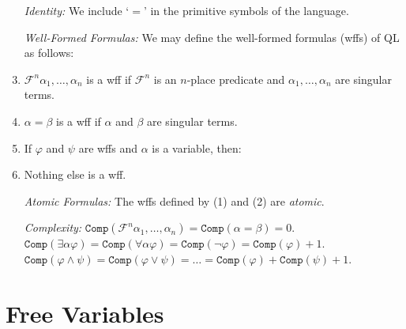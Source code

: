 \documentclass[a4paper, 11pt]{article} %
\newcommand{\F}{\mathcal{F}}
\newcommand{\comp}{\texttt{Comp}}
\begin{document}
\begin{enumerate}
  \item[\it Identity:] We include `$=$' in the primitive symbols of the language.
  \item[\it Well-Formed Formulas:] We may define the well-formed formulas (wffs) of QL as follows:
  \item $\mathcal{F}^n\alpha_1,\ldots,\alpha_n$ is a wff if $\mathcal{F}^n$ is an $n$-place predicate and $\alpha_1,\ldots,\alpha_n$ are singular terms.
  \item $\alpha=\beta$ is a wff if $\alpha$ and $\beta$ are singular terms.
  \item If $\varphi$ and $\psi$ are wffs and $\alpha$ is a variable, then:
    \begin{enumerate}
    \end{enumerate}
  \vspace{-.2in}
  \item Nothing else is a wff.
  \vspace{.1in}
  \item[\it Atomic Formulas:] The wffs defined by (1) and (2) are \textit{atomic}.
  \item[\it Complexity:] $\comp(\F^n\alpha_1,\ldots,\alpha_n)=\comp(\alpha=\beta)=0$.\\
    $\comp(\exists\alpha\varphi)=\comp(\forall\alpha\varphi)=\comp(\neg\varphi)=\comp(\varphi)+1$.\\
    $\comp(\varphi\wedge\psi)=\comp(\varphi\vee\psi)=\ldots=\comp(\varphi)+\comp(\psi)+1$.\\
\end{enumerate}





\section*{Free Variables}
\end{document}
